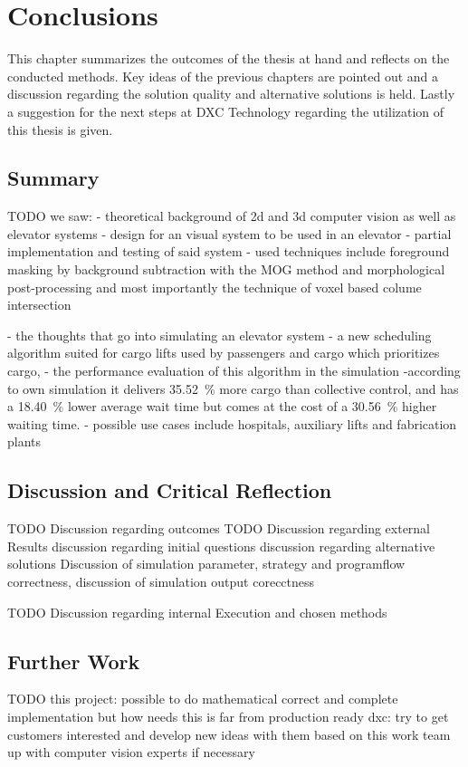\chapter{Conclusions}
\label{chap:concl}

This chapter summarizes the outcomes of the thesis at hand 
and reflects on the conducted methods.
Key ideas of the previous chapters are pointed out and a discussion regarding the solution quality and alternative solutions is held.
Lastly a suggestion for the next steps at DXC Technology regarding the utilization of this thesis is given.

\section{Summary}

TODO
we saw:
- theoretical background of 2d and 3d computer vision as well as elevator systems
- design for an visual system to be used in an elevator
- partial implementation and testing of said system
 - used techniques include foreground masking by background subtraction with the \ac{MOG} method and morphological post-processing and most importantly the technique of voxel based colume intersection


- the thoughts that go into simulating an elevator system
- a new scheduling algorithm suited for cargo lifts used by passengers and cargo
which prioritizes cargo, 
- the performance evaluation of this algorithm in the simulation
-according to own simulation it delivers 35.52~\% more cargo than collective control, and has a 18.40~\% lower average wait time but comes at the cost of a 30.56~\% higher waiting time.
- possible use cases include hospitals, auxiliary lifts and fabrication plants

\section{Discussion and Critical Reflection}

TODO Discussion regarding outcomes
TODO Discussion regarding external Results
discussion regarding initial questions
discussion regarding alternative solutions
Discussion of simulation parameter, strategy and programflow correctness, discussion of simulation output corecctness

TODO  Discussion regarding internal Execution and chosen methods


\section{Further Work}

TODO
this project: possible to do mathematical correct and complete implementation
but how needs this is far from production ready
dxc: try to get customers interested and develop new ideas with them based on this work
team up with computer vision experts if necessary

